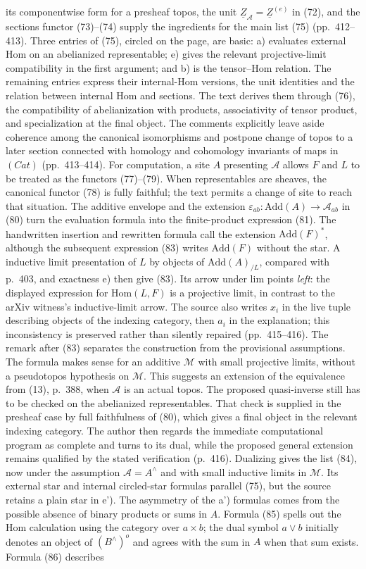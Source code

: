 its componentwise form for a presheaf topos, the unit $\underline Z_{\mathcal A}=\underline Z^{(e)}$ in (72), and the sections functor (73)--(74) supply the ingredients for the main list (75) (pp.\ 412--413). Three entries of (75), circled on the page, are basic: a) evaluates external Hom on an abelianized representable; e) gives the relevant projective-limit compatibility in the first argument; and b) is the tensor--Hom relation. The remaining entries express their internal-Hom versions, the unit identities and the relation between internal Hom and sections. The text derives them through (76), the compatibility of abelianization with products, associativity of tensor product, and specialization at the final object. The comments explicitly leave aside coherence among the canonical isomorphisms and postpone change of topos to a later section connected with homology and cohomology invariants of maps in $(Cat)$ (pp.\ 413--414). For computation, a site $A$ presenting $\mathcal A$ allows $F$ and $L$ to be treated as the functors (77)--(79). When representables are sheaves, the canonical functor (78) is fully faithful; the text permits a change of site to reach that situation. The additive envelope and the extension $\varepsilon_{ab}:\mathrm{Add}(A)\to\mathcal A_{ab}$ in (80) turn the evaluation formula into the finite-product expression (81). The handwritten insertion and rewritten formula call the extension $\mathrm{Add}(F)^*$, although the subsequent expression (83) writes $\mathrm{Add}(F)$ without the star. A inductive limit presentation of $L$ by objects of $\mathrm{Add}(A)_{/L}$, compared with p.\ 403, and exactness e) then give (83). Its arrow under lim points \emph{left}: the displayed expression for $\mathrm{Hom}(L,F)$ is a projective limit, in contrast to the arXiv witness's inductive-limit arrow. The source also writes $x_i$ in the live tuple describing objects of the indexing category, then $a_i$ in the explanation; this inconsistency is preserved rather than silently repaired (pp.\ 415--416). The remark after (83) separates the construction from the provisional assumptions. The formula makes sense for an additive $\mathcal M$ with small projective limits, without a pseudotopos hypothesis on $\mathcal M$. This suggests an extension of the equivalence from (13), p.\ 388, when $\mathcal A$ is an actual topos. The proposed quasi-inverse still has to be checked on the abelianized representables. That check is supplied in the presheaf case by full faithfulness of (80), which gives a final object in the relevant indexing category. The author then regards the immediate computational program as complete and turns to its dual, while the proposed general extension remains qualified by the stated verification (p.\ 416). Dualizing gives the list (84), now under the assumption $\mathcal A=A^\wedge$ and with small inductive limits in $\mathcal M$. Its external star and internal circled-star formulas parallel (75), but the source retains a plain star in e'). The asymmetry of the a') formulas comes from the possible absence of binary products or sums in $A$. Formula (85) spells out the Hom calculation using the category over $a\times b$; the dual symbol $a\vee b$ initially denotes an object of $(B^\wedge)^o$ and agrees with the sum in $A$ when that sum exists. Formula (86) describes 